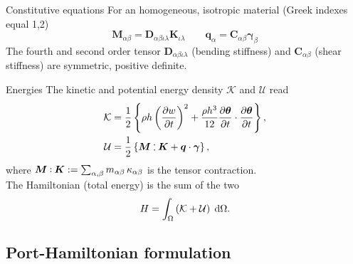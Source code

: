 \documentclass{beamer}
\def\onedot{$\mathsurround0pt\ldotp$}
\def\cddot{%
	\mathbin{\vcenter{\baselineskip.67ex
			\hbox{\onedot}\hbox{\onedot}}%
}}
\begin{document}
\begin{frame}{Constitutive equations}
For an homogeneous, isotropic material (Greek indexes equal 1,2)
\begin{equation*}
\bm{M}_{\alpha \beta} = \bm{D}_{\alpha \beta \iota \lambda} \bm{K}_{\iota \lambda}  \qquad \bm{q}_{\alpha} = \bm{C}_{\alpha \beta} \bm{\gamma}_{\beta}
\end{equation*}
The fourth and second order tensor $\bm{D}_{\alpha \beta \iota \lambda}$ (bending stiffness) and $\bm{C}_{\alpha \beta}$ (shear stiffness) are symmetric, positive definite. \\
\vspace{5mm}
\end{frame}

\begin{frame}{Energies}
The kinetic and potential energy density $\mathcal{K}$ and $\mathcal{U}$ read
\begin{equation*}
\begin{aligned}
\mathcal{K} &=  \frac{1}{2} \left\{ \rho h \left(\diffp{w}{t} \right)^2 +  \frac{\rho h^3}{12} \diffp{\bm{\theta}}{t} \cdot \diffp{\bm{\theta}}{t}  \right\}, \\
\mathcal{U} &= \frac{1}{2} \left\{ \bm{M} \cddot \bm{K} + \bm{q} \cdot \bm{\gamma}  \right\},
\end{aligned}
\end{equation*} 
where $\bm{M} \cddot \bm{K} := \sum_{\alpha, \beta} m_{\alpha \beta} \, \kappa_{\alpha \beta}$ is the tensor contraction. \\
 The Hamiltonian (total energy)  is the sum of the two
\begin{equation*} 
H = \int_{\Omega} \left( \mathcal{K} + \mathcal{U} \right) \d\Omega. 
\end{equation*}
\end{frame}

\subsection{Port-Hamiltonian formulation}
\end{document}
